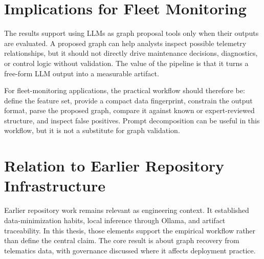 \section{Implications for Fleet Monitoring}

The results support using LLMs as graph proposal tools only when their outputs
are evaluated. A proposed graph can help analysts inspect possible telemetry
relationships, but it should not directly drive maintenance decisions,
diagnostics, or control logic without validation. The value of the pipeline is
that it turns a free-form LLM output into a measurable artifact.

For fleet-monitoring applications, the practical workflow should therefore be:
define the feature set, provide a compact data fingerprint, constrain the
output format, parse the proposed graph, compare it against known or
expert-reviewed structure, and inspect false positives. Prompt decomposition
can be useful in this workflow, but it is not a substitute for graph
validation.

\section{Relation to Earlier Repository Infrastructure}

Earlier repository work remains relevant as engineering context. It
established data-minimization habits, local inference through Ollama, and
artifact traceability. In this thesis, those elements support the empirical
workflow rather than define the central claim. The core result is about graph
recovery from telematics data, with governance discussed where it affects
deployment practice.
